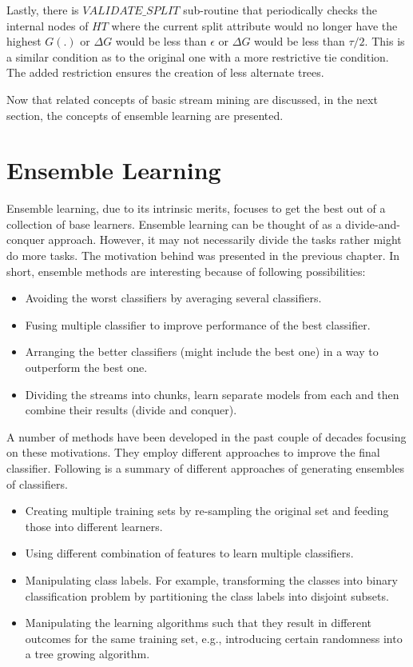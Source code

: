 Lastly, there is $VALIDATE\_SPLIT$ sub-routine that periodically checks the internal nodes of $HT$ where the current split attribute would no longer have the highest $G(.)$ or $\Delta G$ would be less than $\epsilon$ or $\Delta G$ would be less than $\tau/2$. This is a similar condition as to the original one with a more restrictive tie condition. The added restriction ensures the creation of less alternate trees.

Now that related concepts of basic stream mining are discussed, in the next section, the concepts of ensemble learning are presented.

\section{Ensemble Learning}
Ensemble learning, due to its intrinsic merits, focuses to get the best out of a collection of base learners. Ensemble learning can be thought of as a divide-and-conquer approach. However, it may not necessarily divide the tasks rather might do more tasks. The motivation behind was presented in the previous chapter. In short, ensemble methods are interesting because of following possibilities:
\begin{itemize}
    \item Avoiding the worst classifiers by averaging several classifiers.
    \item Fusing multiple classifier to improve performance of the best classifier.
    \item Arranging the better classifiers (might include the best one) in a way to outperform the best one.
    \item Dividing the streams into chunks, learn separate models from each and then combine their results (divide and conquer).
\end{itemize}

A number of methods have been developed in the past couple of decades focusing on these motivations. They employ different approaches to improve the final classifier. Following is a summary of different approaches of generating ensembles of classifiers.
\begin{itemize}
    \item Creating multiple training sets by re-sampling the original set and feeding those into different learners.
    \item Using different combination of features to learn multiple classifiers.
    \item Manipulating class labels. For example, transforming the classes into binary classification problem by partitioning the class labels into disjoint subsets.
    \item Manipulating the learning algorithms such that they result in different outcomes for the same training set, e.g., introducing certain randomness into a tree growing algorithm.
\end{itemize}

